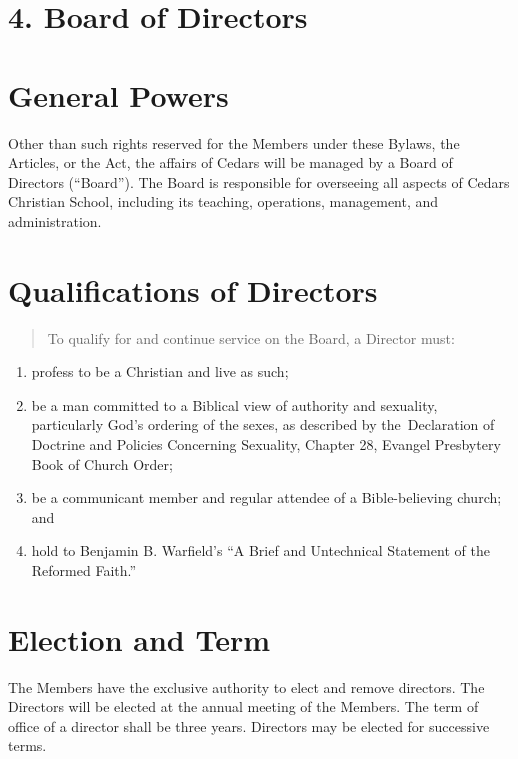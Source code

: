 \documentclass[
]{book}
\begin{document}
\section{4. Board of Directors}\label{board-of-directors}

\section{General Powers}\label{general-powers}

Other than such rights reserved for the Members under these Bylaws,
the Articles, or the Act, the affairs of Cedars will be managed by a
Board of Directors (``Board''). The Board is responsible for overseeing
all aspects of Cedars Christian School, including its teaching,
operations, management, and administration.

\section{Qualifications of Directors}\label{qualifications-of-directors}

\begin{quote}
To qualify for and continue service on the Board, a Director must:
\end{quote}

\begin{enumerate}
\def\labelenumi{\alph{enumi})}
\item
  profess to be a Christian and live as such;
\item
  be a man committed to a Biblical view of authority and sexuality,
  particularly God's ordering of the sexes, as described by
  the~Declaration of Doctrine and Policies Concerning Sexuality,
  Chapter 28, Evangel Presbytery Book of Church Order;
\item
  be a communicant member and regular attendee of a Bible-believing
  church; and
\item
  hold to Benjamin B. Warfield's ``A Brief and Untechnical Statement of
  the Reformed Faith.''
\end{enumerate}

\section{Election and Term}\label{election-and-term}

The Members have the exclusive authority to elect and remove
directors. The Directors will be elected at the annual meeting of the
Members. The term of office of a director shall be three years.
Directors may be elected for successive terms.
\end{document}
